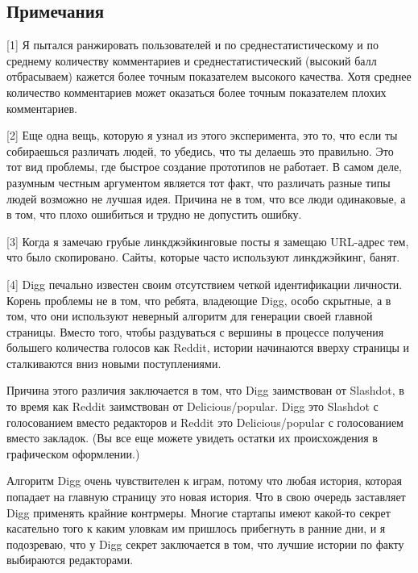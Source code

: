 \documentclass[ebook,12pt,oneside,openany]{memoir}
\begin{document}
\subsection{Примечания}

[1] Я пытался ранжировать пользователей и по среднестатистическому и
по среднему количеству комментариев и среднестатистический (высокий
балл отбрасываем) кажется более точным показателем высокого качества.
Хотя среднее количество комментариев может оказаться более точным
показателем плохих комментариев. \newline

[2] Еще одна вещь, которую я узнал из этого эксперимента, это то, что
если ты собираешься различать людей, то убедись, что ты делаешь это
правильно. Это тот вид проблемы, где быстрое создание прототипов не
работает. В самом деле, разумным честным аргументом является тот факт,
что различать разные типы людей возможно не лучшая идея. Причина не в
том, что все люди одинаковые, а в том, что плохо ошибиться и трудно не
допустить ошибку. \newline

[3] Когда я замечаю грубые линкджэйкинговые посты я замещаю URL-адрес
тем, что было скопировано. Сайты, которые часто используют
линкджэйкинг, банят. \newline

[4] Digg печально известен своим отсутствием четкой идентификации
личности. Корень проблемы не в том, что ребята, владеющие Digg, особо
скрытные, а в том, что они используют неверный алгоритм для генерации
своей главной страницы. Вместо того, чтобы раздуваться с вершины в
процессе получения большего количества голосов как Reddit, истории
начинаются вверху страницы и сталкиваются вниз новыми поступлениями. \newline

Причина этого различия заключается в том, что Digg заимствован от
Slashdot, в то время как Reddit заимствован от Delicious/popular. Digg
это Slashdot с голосованием вместо редакторов и Reddit это
Delicious/popular с голосованием вместо закладок. (Вы все еще можете
увидеть остатки их происхождения в графическом оформлении.) \newline

Алгоритм Digg очень чувствителен к играм, потому что любая история,
которая попадает на главную страницу это новая история. Что в свою
очередь заставляет Digg применять крайние контрмеры. Многие стартапы
имеют какой-то секрет касательно того к каким уловкам им пришлось
прибегнуть в ранние дни, и я подозреваю, что у Digg секрет заключается
в том, что лучшие истории по факту выбираются редакторами. \newline
\end{document}
